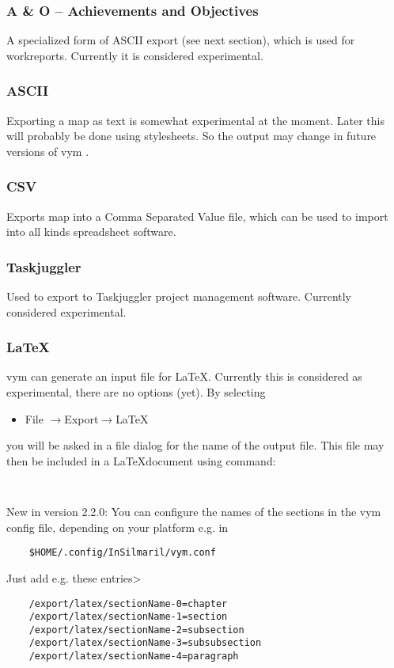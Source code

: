 \documentclass[12pt,a4paper]{article}
\newcommand{\vym}{{\sc vym }}
\newcommand{\ra}{$\longrightarrow$}
\begin{document}
\subsubsection{A \& O -- Achievements and Objectives}
A specialized form of ASCII export (see next section), which is used for
workreports. Currently it is considered experimental.

\subsubsection{ASCII}
Exporting a map as text is somewhat experimental at the moment. Later
this will probably be done using stylesheets. So the output may change
in future versions of \vym.

\subsubsection{CSV}
Exports map into a Comma Separated Value file, which can be used to
import into all kinds spreadsheet software.

\subsubsection{Taskjuggler}
Used to export to Taskjuggler project management software. Currently
considered experimental.

\subsubsection{\LaTeX}
\vym can generate an input file for \LaTeX. Currently this is considered
as experimental, there are no options (yet). 
By selecting
\begin{itemize}
    \item File  \ra Export\ra \LaTeX 
\end{itemize}
you will be asked in a file dialog for the name of the output file. This
file may then be included in a \LaTeX document using command: 
\begin{verbatim}
    
\end{verbatim}
New in version 2.2.0: You can configure the names of the sections in the
vym config file, depending on your platform e.g. in 
\begin{verbatim}
    $HOME/.config/InSilmaril/vym.conf
\end{verbatim}
Just add e.g. these entries>
\begin{verbatim}
    /export/latex/sectionName-0=chapter
    /export/latex/sectionName-1=section
    /export/latex/sectionName-2=subsection
    /export/latex/sectionName-3=subsubsection
    /export/latex/sectionName-4=paragraph
\end{verbatim}
\end{document}
